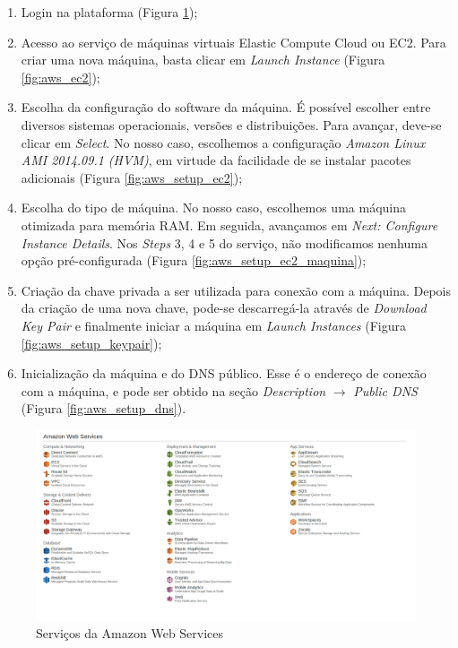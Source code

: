 \begin{enumerate}
\item Login na plataforma (Figura \ref{fig:aws_servicos});
\item Acesso ao serviço de máquinas virtuais Elastic Compute Cloud ou EC2. Para criar uma nova máquina, basta clicar em \textit{Launch Instance} (Figura \ref{fig:aws_ec2});
\item Escolha da configuração do software da máquina. É possível escolher entre diversos sistemas operacionais, versões e distribuições. Para avançar, deve-se clicar em \textit{Select}. No nosso caso, escolhemos a configuração \textit{Amazon Linux AMI 2014.09.1 (HVM)}, em virtude da facilidade de se instalar pacotes adicionais  (Figura \ref{fig:aws_setup_ec2});
\item Escolha do tipo de máquina. No nosso caso, escolhemos uma máquina otimizada para memória RAM. Em seguida, avançamos em \textit{Next: Configure Instance Details}. Nos \textit{Steps} 3, 4 e 5 do serviço, não modificamos nenhuma opção pré-configurada (Figura \ref{fig:aws_setup_ec2_maquina});
\item Criação da chave privada a ser utilizada para conexão com a máquina. Depois da criação de uma nova chave, pode-se descarregá-la através de \textit{Download Key Pair} e finalmente iniciar a máquina em \textit{Launch Instances} (Figura \ref{fig:aws_setup_keypair});
\item Inicialização da máquina e do DNS público. Esse é o endereço de conexão com a máquina, e pode ser obtido na seção \textit{Description} $\rightarrow$ \textit{Public DNS} (Figura \ref{fig:aws_setup_dns}).
\end{enumerate}

\begin{figure}[htp]
    \begin{center}
    \includegraphics[width=1\textwidth]{img/aws_servicos}
    \end{center}
    \caption{Serviços da Amazon Web Services}
    \label{fig:aws_servicos}
\end{figure}

